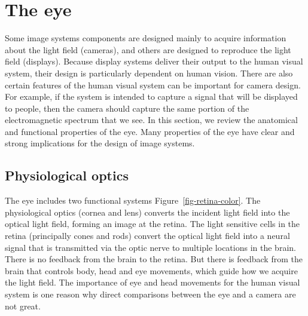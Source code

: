 \documentclass[
  letterpaper,
]{book}
\begin{document}
\section{The eye}\label{the-eye}

Some image systems components are designed mainly to acquire information
about the light field (cameras), and others are designed to reproduce
the light field (displays). Because display systems deliver their output
to the human visual system, their design is particularly dependent on
human vision. There are also certain features of the human visual system
can be important for camera design. For example, if the system is
intended to capture a signal that will be displayed to people, then the
camera should capture the same portion of the electromagnetic spectrum
that we see. In this section, we review the anatomical and functional
properties of the eye. Many properties of the eye have clear and strong
implications for the design of image systems.

\subsection{Physiological optics}\label{physiological-optics}

The eye includes two functional systems Figure~\ref{fig-retina-color}.
The physiological optics (cornea and lens) converts the incident light
field into the optical light field, forming an image at the retina. The
light sensitive cells in the retina (principally cones and rods) convert
the optical light field into a neural signal that is transmitted via the
optic nerve to multiple locations in the brain. There is no feedback
from the brain to the retina. But there is feedback from the brain that
controls body, head and eye movements, which guide how we acquire the
light field. The importance of eye and head movements for the human
visual system is one reason why direct comparisons between the eye and a
camera are not great.
\end{document}
